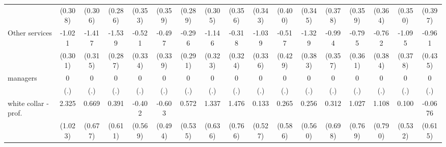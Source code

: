{\begin{tabular}{l*{16}{c}}
                    &     (0.308)         &     (0.306)         &     (0.286)         &     (0.353)         &     (0.359)         &     (0.289)         &     (0.305)         &     (0.356)         &     (0.343)         &     (0.400)         &     (0.345)         &     (0.378)         &     (0.359)         &     (0.364)         &     (0.350)         &     (0.397)         \\
[1em]
Other services      &      -1.021\sym{***}&      -1.417\sym{***}&      -1.539\sym{***}&      -0.521         &      -0.497         &      -0.296         &      -1.146\sym{***}&      -0.318         &      -1.039\sym{**} &      -0.517         &      -1.329\sym{***}&      -0.994\sym{**} &      -0.795\sym{*}  &      -0.762\sym{*}  &      -1.095\sym{**} &      -0.961\sym{*}  \\
                    &     (0.301)         &     (0.315)         &     (0.287)         &     (0.334)         &     (0.339)         &     (0.291)         &     (0.323)         &     (0.324)         &     (0.336)         &     (0.429)         &     (0.383)         &     (0.357)         &     (0.361)         &     (0.384)         &     (0.378)         &     (0.435)         \\
[1em]
managers            &           0         &           0         &           0         &           0         &           0         &           0         &           0         &           0         &           0         &           0         &           0         &           0         &           0         &           0         &           0         &           0         \\
                    &         (.)         &         (.)         &         (.)         &         (.)         &         (.)         &         (.)         &         (.)         &         (.)         &         (.)         &         (.)         &         (.)         &         (.)         &         (.)         &         (.)         &         (.)         &         (.)         \\
[1em]
white collar - prof.&       2.325\sym{*}  &       0.669         &       0.391         &      -0.402         &      -0.603         &       0.572         &       1.337\sym{*}  &       1.476         &       0.133         &       0.265         &       0.256         &       0.312         &       1.027         &       1.108         &       0.100         &     -0.0676         \\
                    &     (1.023)         &     (0.677)         &     (0.611)         &     (0.569)         &     (0.494)         &     (0.535)         &     (0.636)         &     (0.766)         &     (0.527)         &     (0.586)         &     (0.560)         &     (0.698)         &     (0.769)         &     (0.790)         &     (0.532)         &     (0.615)         \\

\end{tabular}}
